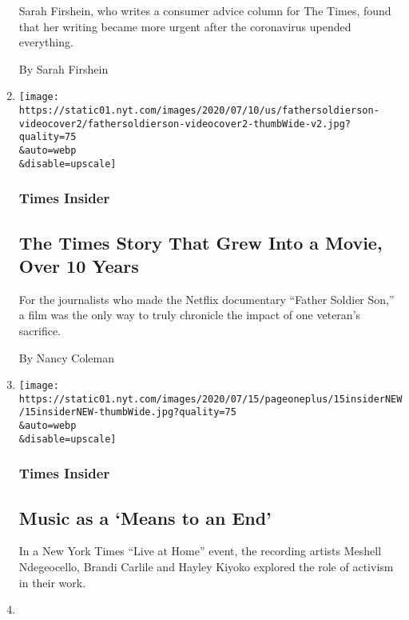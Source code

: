 \begin{enumerate}
  Sarah Firshein, who writes a consumer advice column for The Times,
  found that her writing became more urgent after the coronavirus
  upended everything.

  By Sarah Firshein
\item
  \href{/2020/07/17/insider/father-soldier-son.html}{}

  \texttt{[image: https://static01.nyt.com/images/2020/07/10/us/fathersoldierson-videocover2/fathersoldierson-videocover2-thumbWide-v2.jpg?quality=75\\\&auto=webp\\\&disable=upscale]}

  \hypertarget{times-insider-7}{%
  \subsubsection{Times Insider}\label{times-insider-7}}

  \hypertarget{the-times-story-that-grew-into-a-movie-over-10-years}{%
  \subsection{The Times Story That Grew Into a Movie, Over 10
  Years}\label{the-times-story-that-grew-into-a-movie-over-10-years}}

  For the journalists who made the Netflix documentary ``Father Soldier
  Son,'' a film was the only way to truly chronicle the impact of one
  veteran's sacrifice.

  By Nancy Coleman
\item
  \href{/2020/07/15/insider/music-queer-activism.html}{}

  \texttt{[image: https://static01.nyt.com/images/2020/07/15/pageoneplus/15insiderNEW/15insiderNEW-thumbWide.jpg?quality=75\\\&auto=webp\\\&disable=upscale]}

  \hypertarget{times-insider-8}{%
  \subsubsection{Times Insider}\label{times-insider-8}}

  \hypertarget{music-as-a-means-to-an-end}{%
  \subsection{Music as a `Means to an
  End'}\label{music-as-a-means-to-an-end}}

  In a New York Times ``Live at Home'' event, the recording artists
  Meshell Ndegeocello, Brandi Carlile and Hayley Kiyoko explored the
  role of activism in their work.
\item
  \href{/2020/07/10/insider/magazine-decameron-fiction-issue.html}{}


\end{enumerate}
